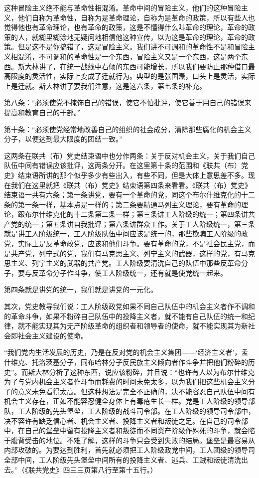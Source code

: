 这种冒险主义绝不能与革命性相混淆。革命中间的冒险主义，他们的这种冒险主义，他们自称为革命性，自称为是革命理论，自称为是革命的政策，所以有些人也觉得他也有革命理论，也有革命的政策，这是不懂得什么叫革命的理论，革命的政策的人，就糊里糊涂地无疑问地相信他这种宣传，以为这是革命的理论，革命的政策。但是这不是你搞错了，这是冒险主义。我们讲不可调和的革命性不是和冒险主义相混淆，不可调和的革命性是一个东西，冒险主义又是一个东西，这是两个东西。斯大林讲了，在统一战线中右倾的东西可能增长，所以我们要防止那种借口最高限度的灵活性，实际上变成了迁就行为。典型的是张国焘，口头上是灵活，实际上是迁就。斯大林讲了要我们注意，这是这六条，第七条的补充。

第八条：“必须使党不掩饰自己的错误，使它不怕批评，使它善于用自己的错误来提高和教育自己的干部。”

第十条：“必须使党经常地改善自己的组织的社会成分，清除那些腐化的机会主义分子，以便达到最大限度的团结一致。”

这两条在联共（布）党史结束语中也分作两条：关于反对机会主义，关于我们自己队伍中间有错误应该批评，这两条分开。在这里第十条的范围和《联共（布）党史》结束语所讲的那个似乎多少有些出入，有些不同，但是大体上意思差不多。现在我们在这里就把《联共（布）党史》结束语第四条来看看。《联共（布）党史》结束语一共有六条；第一条讲党，要有一个革命的党，同这个布尔什维克化的十二条的第一条一样，基本点是一样的；第二条要精通马列主义理论，要有革命的理论，跟布尔什维克化的十二条第二条一样；第三条讲工人阶级的统一；第四条讲共产党的统一；第五条讲自我批评；第六条讲群众工作。关于工人阶级统一，第三条就是讲工人阶级统一，工人阶级队伍中间应该是统一的，那些欺骗工人阶级的政党，实际上是反革命政党，应该和他们斗争。要有革命的党，不是社会民主党，而是共产党，列宁式的党，我们有马克思主义、列宁主义的武器，这样的党，有马克思主义、列宁主义的武器的共产党。工人阶级要清洗自己的队伍中那些反革命分子，要与反革命分子作斗争，使工人阶级统一，还有就是使党统一起来。

第四条就是讲党的统一，我们就是讲党的一元化。

其次，党史教导我们说：工人阶级政党如果不同自己队伍中的机会主义者作不调和的革命斗争，如果不粉碎自己队伍中的投降主义者，就不能有自己队伍的统一和纪律，就不能实现其为无产阶级革命的组织者和领导者的使命，就不能实现其为新社会即社会主义建设的使命。

“我们党内生活发展的历史，乃是在反对党的机会主义集团――‘经济主义者’，孟什维克、托洛茨基分子，同布哈林分子反民族主义倾向者作斗争并把他们粉碎的历史”。而斯大林分析了这种东西，说应该粉碎，并且说：“也许有人以为布尔什维克为了与党内机会主义者作斗争而耗费的时间未免太多，以为我们把这些机会主义分子的意义未免看得太高。但这种想法是完全不正确的，决不能容忍自己队伍中间有机会主义存在，正如不能容忍健全身体上有毒疮生长一样。党是工人阶级的领导部队，工人阶级的先头堡垒，工人阶级的战斗司令部。在工人阶级的领导司令部中，决不容许有缺乏信心者、机会主义者、投降主义者和叛徒之足。在自己的司令部中，在自己的堡垒中留有投降主义者和叛徒而不同资产阶级作殊死的斗争，就会陷于腹背受击的地位。不难了解，这样的斗争只会受到失败的结局。堡垒是最容易从内部攻破的。为要达到胜利，首先就必须把工人阶级政党中间，工人团级的领导司全部中间，工人阶级先头堡垒中间所有的投降主义者、逃兵、工贼和叛徒清洗出去。”（《联共党史》四三三页第八行至第十五行。）


